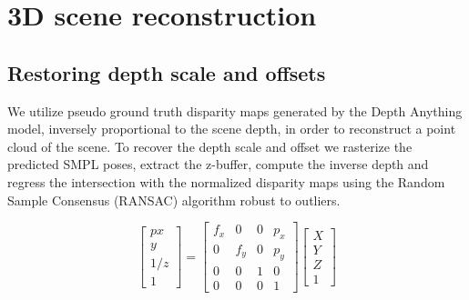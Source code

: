 \section{3D scene reconstruction}






\subsection*{Restoring depth scale and offsets}
We utilize pseudo ground truth disparity maps generated by the Depth Anything model, inversely proportional to the scene depth, in order to reconstruct a point cloud of the scene. To recover the depth scale and offset we rasterize the predicted SMPL poses, extract the z-buffer, compute the inverse depth and regress the intersection with the normalized disparity maps using the Random Sample Consensus (RANSAC) algorithm robust to outliers. 

\begin{equation}
    \begin{bmatrix}p
        x \\ y \\ 1/z \\ 1
    \end{bmatrix} = \begin{bmatrix}
        f_x & 0 & 0 & p_x \\
        0 & f_y & 0 & p_y \\
        0 & 0 & 1 & 0 \\
        0 & 0 & 0 & 1
    \end{bmatrix} \begin{bmatrix}
        X \\ Y \\ Z \\ 1
    \end{bmatrix}
\end{equation}


